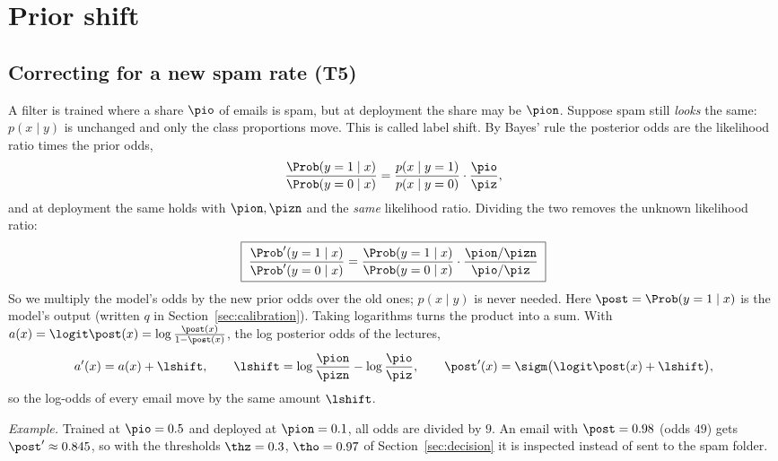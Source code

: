 \section{Prior shift}
\label{sec:prior-shift}

\subsection{Correcting for a new spam rate (T5)}
\label{sec:t5}

A filter is trained where a share $\pio$ of emails is spam, but at deployment the share may be $\pion$.
Suppose spam still \emph{looks} the same: $p(x\mid y)$ is unchanged and only the class proportions move.
This is called label shift. By Bayes' rule the posterior odds are the likelihood ratio times the prior odds,
\begin{equation}
  \frac{\Prob(y=1\mid x)}{\Prob(y=0\mid x)} = \frac{p(x\mid y=1)}{p(x\mid y=0)}\cdot\frac{\pio}{\piz},
  \label{eq:t5-odds-train}
\end{equation}
and at deployment the same holds with $\pion,\pizn$ and the \emph{same} likelihood ratio. Dividing the two
removes the unknown likelihood ratio:
\begin{equation}
  \boxed{\;\frac{\Prob'(y=1\mid x)}{\Prob'(y=0\mid x)}
  = \frac{\Prob(y=1\mid x)}{\Prob(y=0\mid x)}\cdot\frac{\pion/\pizn}{\pio/\piz}\;}
  \label{eq:t5-odds}
\end{equation}
So we multiply the model's odds by the new prior odds over the old ones; $p(x\mid y)$ is never needed.
Here $\post=\Prob(y=1\mid x)$ is the model's output (written $q$ in Section~\ref{sec:calibration}).
Taking logarithms turns the product into a sum. With $a(x)=\logit\post(x)=\log\frac{\post(x)}{1-\post(x)}$,
the log posterior odds of the lectures,
\begin{equation}
  a'(x) = a(x) + \lshift, \qquad
  \lshift = \log\frac{\pion}{\pizn} - \log\frac{\pio}{\piz}, \qquad
  \post'(x) = \sigm\big(\logit\post(x) + \lshift\big),
  \label{eq:t5-shift}
\end{equation}
so the log-odds of every email move by the same amount $\lshift$.

\emph{Example.} Trained at $\pio=0.5$ and deployed at $\pion=0.1$, all odds are divided by $9$. An email
with $\post=0.98$ (odds $49$) gets $\post'\approx0.845$, so with the thresholds $\thz=0.3$, $\tho=0.97$ of
Section~\ref{sec:decision} it is inspected instead of sent to the spam folder.

